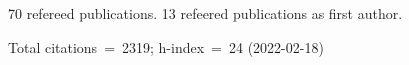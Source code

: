 70 refereed publications. 13 refeered publications as first author.

Total citations~=~2319; h-index~=~24 (2022-02-18)